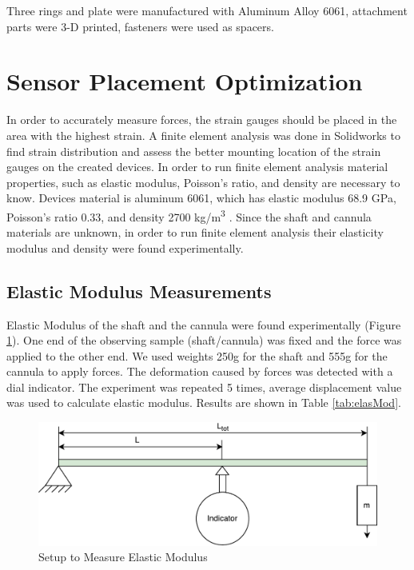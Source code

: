Three rings and plate were manufactured with Aluminum Alloy 6061, attachment parts were 3-D printed, fasteners were used as spacers.

\section{Sensor Placement Optimization}
\label{sec:SimMod}
In order to accurately measure forces, the strain gauges should be placed in the area with the highest strain. A finite element analysis was done in Solidworks to find strain distribution and assess the better mounting location of the strain gauges on the created devices. In order to run finite element analysis material properties, such as elastic modulus, Poisson's ratio, and density are necessary to know. Devices material is aluminum 6061, which has elastic modulus 68.9 GPa, Poisson's ratio 0.33, and density 2700 kg/m\textsuperscript{3} \cite{aluminum_properties}. Since the shaft and cannula materials are unknown, in order to run finite element analysis their elasticity modulus and density were found experimentally.
	
	\subsection{Elastic Modulus Measurements}
	\label{sec:ElasMod}
	Elastic Modulus of the shaft and the cannula were found experimentally (Figure \ref{fig:ElasModSet}). One end of the observing sample (shaft/cannula) was fixed and the force was applied to the other end. We used weights 250g for the shaft and 555g for the cannula to apply forces. The deformation caused by forces was detected with a dial indicator. The experiment was repeated 5 times, average displacement value was used to calculate elastic modulus. Results are shown in Table \ref{tab:elasMod}.
	
\begin{figure}[h]
	\begin{center}
		\includegraphics[width=120mm]{fig/methods/el_mod_set.pdf}
	\end{center}
	\vspace{-4mm}
	\caption[Setup to Measure Elastic Modulus]
	{Setup to Measure Elastic Modulus}
	\label{fig:ElasModSet}
	\vspace{-2mm}
\end{figure}

